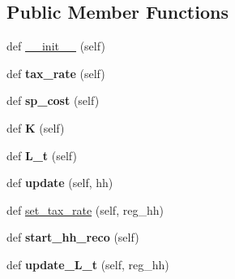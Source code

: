 \subsection*{Public Member Functions}
\begin{DoxyCompactItemize}
\item 
def \hyperlink{classgovernment_1_1Government_a20d7e7f64fa8fed27b63ace640f38065}{\+\_\+\+\_\+init\+\_\+\+\_\+} (self)
\item 
\mbox{\label{classgovernment_1_1Government_a9c46e1fc5740686cf4caabb7455242e4}} 
def {\bfseries tax\+\_\+rate} (self)
\item 
\mbox{\label{classgovernment_1_1Government_a576829808c2a5fa937bfe14cdf764741}} 
def {\bfseries sp\+\_\+cost} (self)
\item 
\mbox{\label{classgovernment_1_1Government_aac69e3171408501995df5aa8885caaa6}} 
def {\bfseries K} (self)
\item 
\mbox{\label{classgovernment_1_1Government_a2eb88be006ea8dc3d2b8ccb1130e6c71}} 
def {\bfseries L\+\_\+t} (self)
\item 
\mbox{\label{classgovernment_1_1Government_a1a28cd2b1dd21cf5b8b8d384efcbe9a8}} 
def {\bfseries update} (self, hh)
\item 
def \hyperlink{classgovernment_1_1Government_adc27c11d09806596774abc2b4e786cc4}{set\+\_\+tax\+\_\+rate} (self, reg\+\_\+hh)
\item 
\mbox{\label{classgovernment_1_1Government_ae63c718191d2781db4567e0aa30cf444}} 
def {\bfseries start\+\_\+hh\+\_\+reco} (self)
\item 
\mbox{\label{classgovernment_1_1Government_a52f80ef2c1d974be4543e1f368e3a928}} 
def {\bfseries update\+\_\+\+L\+\_\+t} (self, reg\+\_\+hh)
\end{DoxyCompactItemize}


